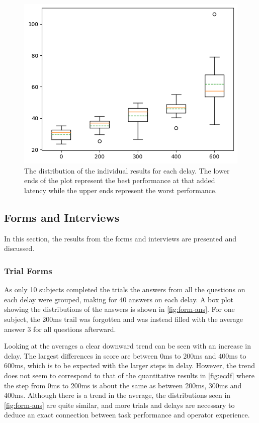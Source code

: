 \documentclass[nofilelist]{cslthse-msc}
\begin{document}
\begin{figure}[!hbt]
   \centering
   \includegraphics[scale=0.8]{images/indv-perf.png} 
   \caption{The distribution of the individual results for each delay. The lower ends of the plot represent the best performance at that added latency while the upper ends represent the worst performance.}
   \label{fig:indv-perf}
\end{figure}

\subsection{Forms and Interviews}
In this section, the results from the forms and interviews are presented and discussed.

\subsubsection{Trial Forms}
As only 10 subjects completed the trials the answers from all the questions on each delay were grouped, making for 40 answers on each delay. A box plot showing the distributions of the answers is shown in \ref{fig:form-ans}. For one subject, the 200ms trail was forgotten and was instead filled with the average answer 3 for all questions afterward.

Looking at the averages a clear downward trend can be seen with an increase in delay. The largest differences in score are between 0ms to 200ms and 400ms to 600ms, which is to be expected with the larger steps in delay. However, the trend does not seem to correspond to that of the quantitative results in \ref{fig:ecdf} where the step from 0ms to 200ms is about the same as between 200ms, 300ms and 400ms. Although there is a trend in the average, the distributions seen in \ref{fig:form-ans} are quite similar, and more trials and delays are necessary to deduce an exact connection between task performance and operator experience.   
\end{document}
